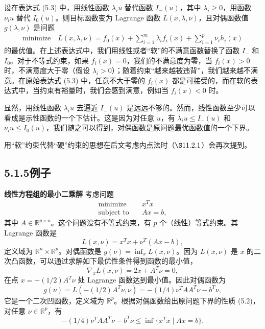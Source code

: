 \documentclass[UTF8,12pt,a4paper,fontset=fandol]{ctexart}
\begin{document}
设在表达式 (5.3) 中，用线性函数 $\lambda_i u$ 替代函数 $I_-(u)$，其中 $\lambda_i\geq 0$，用函数 $\nu_i u$ 替代 $I_0(u)$。则目标函数变为 Lagrange 函数 $L(x,\lambda,\nu)$，且对偶函数值 $g(\lambda,\nu)$ 是问题
\begin{equation}
\begin{aligned}
\text{minimize}\quad
L(x,\lambda,\nu)=f_0(x)+\sum_{i=1}^m \lambda_i f_i(x)+\sum_{i=1}^p \nu_i h_i(x)
\end{aligned}
\tag{5.4}
\end{equation}
的最优值。在上述表达式中，我们用线性或者``软''的不满意函数替换了函数 $I_-$ 和 $I_0$。对于不等式约束，如果 $f_i(x)=0$，我们的不满意度为零，当 $f_i(x)>0$ 时，不满意度大于零（假设 $\lambda_i>0$）；随着约束``越来越被违背''，我们越来越不满意。在原始表达式 (5.3) 中，任意不大于零的 $f_i(x)$ 都是可接受的，而在软的表达式中，当约束有裕量时，我们会感到满意，例如当 $f_i(x)<0$ 时。

显然，用线性函数 $\lambda_i u$ 去逼近 $I_-(u)$ 是远远不够的。然而，线性函数至少可以看成是示性函数的一个下估计。这是因为对任意 $u$，有 $\lambda_i u\leq I_-(u)$ 和 $\nu_i u\leq I_0(u)$，我们随之可以得到，对偶函数是原问题最优函数值的一个下界。

用``软''约束代替``硬''约束的思想在后文考虑内点法时（$\S 11.2.1$）会再次提到。

\subsection*{5.1.5\quad 例子}

\noindent\textbf{线性方程组的最小二乘解}\quad
考虑问题
\begin{equation}
\begin{aligned}
\text{minimize}\quad & x^T x\\
\text{subject to}\quad & Ax=b,
\end{aligned}
\tag{5.5}
\end{equation}
其中 $A\in\mathbb{R}^{p\times n}$。这个问题没有不等式约束，有 $p$ 个（线性）等式约束。其 Lagrange 函数是
\[
L(x,\nu)=x^Tx+\nu^T(Ax-b),
\]
定义域为 $\mathbb{R}^n\times\mathbb{R}^p$。对偶函数是 $g(\nu)=\inf_x L(x,\nu)$。因为 $L(x,\nu)$ 是 $x$ 的二次凸函数，可以通过求解如下最优性条件得到函数的最小值，
\[
\nabla_x L(x,\nu)=2x+A^T\nu=0,
\]
在点 $x=-(1/2)A^T\nu$ 处 Lagrange 函数达到最小值。因此对偶函数为
\[
g(\nu)=L(-(1/2)A^T\nu,\nu)=-(1/4)\nu^TAA^T\nu-b^T\nu,
\]
它是一个二次凹函数，定义域为 $\mathbb{R}^p$。根据对偶函数给出原问题下界的性质 (5.2)，对任意 $\nu\in\mathbb{R}^p$，有
\[
-(1/4)\nu^TAA^T\nu-b^T\nu\leq \inf\{x^Tx\mid Ax=b\}.
\]
\end{document}
